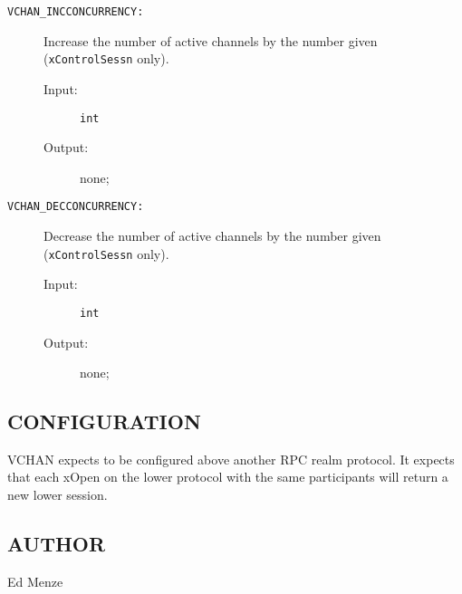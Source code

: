 \begin{description}

\item[{\tt VCHAN\_INCCONCURRENCY:}]
Increase the number of active channels by the number given
({\tt xControlSessn} only).
\begin{description}
\item[{\rm Input:}] {\tt int}
\item[{\rm Output:}] none;
\end{description}

\item[{\tt VCHAN\_DECCONCURRENCY:}]
Decrease the number of active channels by the number given
({\tt xControlSessn} only).
\begin{description}
\item[{\rm Input:}] {\tt int}
\item[{\rm Output:}] none;
\end{description}

\end{description}

\subsection*{CONFIGURATION}

VCHAN expects to be configured above another RPC realm protocol.  It
expects that each xOpen on the lower protocol with the same
participants will return a new lower session.  

\subsection*{AUTHOR}

\noindent Ed Menze
